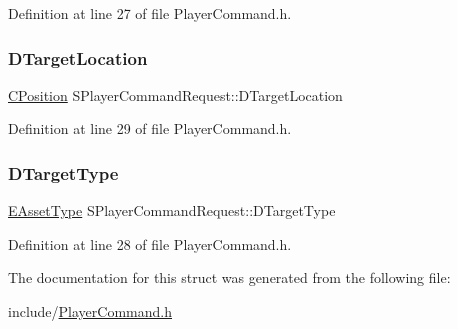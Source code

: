 Definition at line 27 of file Player\+Command.\+h.

\hypertarget{structSPlayerCommandRequest_a701702b94ca2fd2738e95ef6711dd41a}{}\label{structSPlayerCommandRequest_a701702b94ca2fd2738e95ef6711dd41a} 
\subsubsection{\texorpdfstring{D\+Target\+Location}{DTargetLocation}}
{\footnotesize\ttfamily \hyperlink{classCPosition}{C\+Position} S\+Player\+Command\+Request\+::\+D\+Target\+Location}



Definition at line 29 of file Player\+Command.\+h.

\hypertarget{structSPlayerCommandRequest_a864e47c641127665751091876a6d3c5e}{}\label{structSPlayerCommandRequest_a864e47c641127665751091876a6d3c5e} 
\subsubsection{\texorpdfstring{D\+Target\+Type}{DTargetType}}
{\footnotesize\ttfamily \hyperlink{GameDataTypes_8h_a5600d4fc433b83300308921974477fec}{E\+Asset\+Type} S\+Player\+Command\+Request\+::\+D\+Target\+Type}



Definition at line 28 of file Player\+Command.\+h.



The documentation for this struct was generated from the following file\+:\begin{DoxyCompactItemize}
\item 
include/\hyperlink{PlayerCommand_8h}{Player\+Command.\+h}\end{DoxyCompactItemize}
